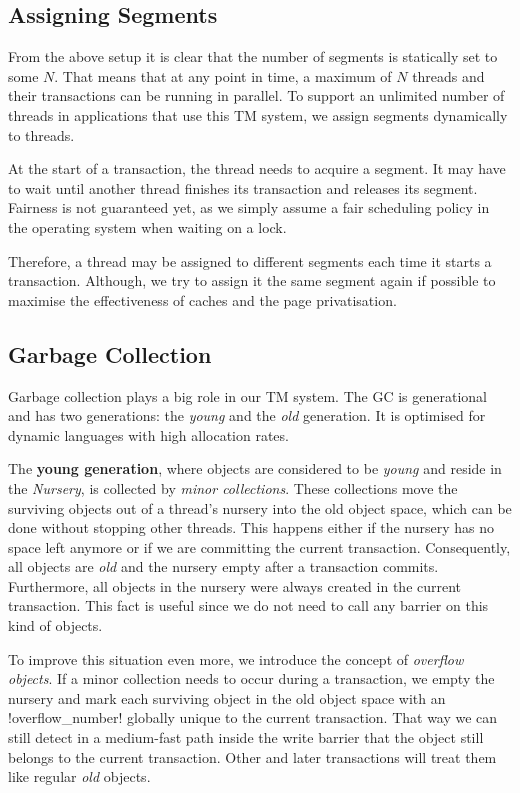 \documentclass{sigplanconf}
\makeatletter
\renewcommand\lstinline[1][]{%
  \Collectverb{\@@myverb}%
}
\def\@@myverb#1{%
    \begingroup
    \fboxsep=0.2em
    \colorbox{verylightgray}{\oldlstinline|#1|}%
    \endgroup
}
\makeatother
\begin{document}
\subsection{Assigning Segments}

From the above setup it is clear that the number of segments is
statically set to some $N$. That means that at any point in time, a
maximum of $N$ threads and their transactions can be running in
parallel.  To support an unlimited number of threads in applications
that use this TM system, we assign segments dynamically to threads.

At the start of a transaction, the thread needs to acquire a
segment. It may have to wait until another thread finishes its
transaction and releases its segment. Fairness is not guaranteed yet, as
we simply assume a fair scheduling policy in the operating system when
waiting on a lock.

Therefore, a thread may be assigned to different segments each time it
starts a transaction. Although, we try to assign it the same segment
again if possible to maximise the effectiveness of caches and the
page privatisation.



\subsection{Garbage Collection\label{sub:gc}}

Garbage collection plays a big role in our TM system. The GC is
generational and has two generations: the \emph{young} and the
\emph{old} generation. It is optimised for dynamic languages with
high allocation rates.

The \textbf{young generation}, where objects are considered to be
\emph{young} and reside in the \emph{Nursery}, is collected by
\emph{minor collections}. These collections move the surviving objects
out of a thread's nursery into the old object space, which can be done
without stopping other threads. This happens either if the nursery has
no space left anymore or if we are committing the current
transaction. Consequently, all objects are \emph{old} and the nursery empty
after a transaction commits.  Furthermore, all objects in the nursery
were always created in the current transaction. This fact is useful
since we do not need to call any barrier on this kind of objects.

To improve this situation even more, we introduce the concept of
\emph{overflow objects}. If a minor collection needs to occur during a
transaction, we empty the nursery and mark each surviving object in
the old object space with an \lstinline!overflow_number!  globally
unique to the current transaction. That way we can still detect in a
medium-fast path inside the write barrier that the object still belongs to the
current transaction. Other and later transactions will treat them
like regular \emph{old} objects.
\end{document}
